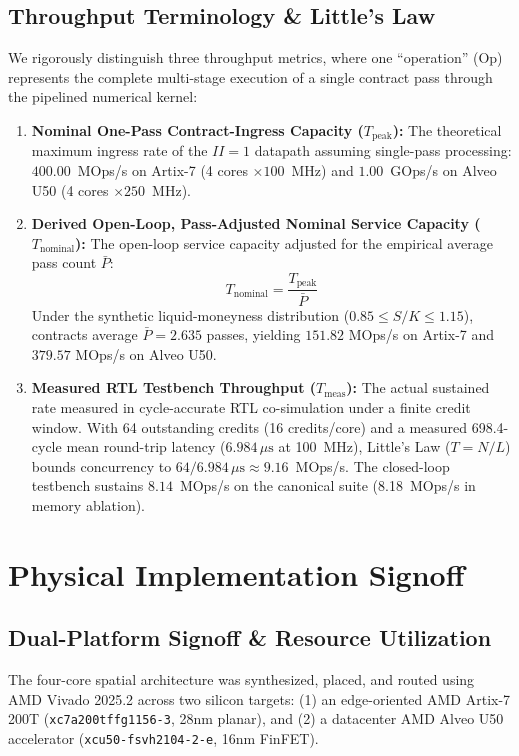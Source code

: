 \documentclass[sigconf,anonymous,review]{acmart}
\begin{document}
\subsection{Throughput Terminology \& Little's Law}
We rigorously distinguish three throughput metrics, where one ``operation'' (Op) represents the complete multi-stage execution of a single contract pass through the pipelined numerical kernel:
\begin{enumerate}
    \item \textbf{Nominal One-Pass Contract-Ingress Capacity ($T_{\text{peak}}$):} The theoretical maximum ingress rate of the $II=1$ datapath assuming single-pass processing: $400.00$~MOps/s on Artix-7 (4 cores $\times 100$~MHz) and $1.00$~GOps/s on Alveo U50 (4 cores $\times 250$~MHz).
    \item \textbf{Derived Open-Loop, Pass-Adjusted Nominal Service Capacity ($T_{\text{nominal}}$):} The open-loop service capacity adjusted for the empirical average pass count $\bar{P}$:
    \begin{equation}
        T_{\text{nominal}} = \frac{T_{\text{peak}}}{\bar{P}}
    \end{equation}
    Under the synthetic liquid-moneyness distribution ($0.85 \le S/K \le 1.15$), contracts average $\bar{P} = 2.635$ passes, yielding $151.82$ MOps/s on Artix-7 and $379.57$ MOps/s on Alveo U50.
    \item \textbf{Measured RTL Testbench Throughput ($T_{\text{meas}}$):} The actual sustained rate measured in cycle-accurate RTL co-simulation under a finite credit window. With 64 outstanding credits (16 credits/core) and a measured 698.4-cycle mean round-trip latency ($6.984\,\mu\text{s}$ at 100~MHz), Little's Law ($T = N / L$) bounds concurrency to $64 / 6.984\,\mu\text{s} \approx 9.16$~MOps/s. The closed-loop testbench sustains $8.14$~MOps/s on the canonical suite (8.18~MOps/s in memory ablation).
\end{enumerate}

\section{Physical Implementation Signoff}
\subsection{Dual-Platform Signoff \& Resource Utilization}
The four-core spatial architecture was synthesized, placed, and routed using AMD Vivado 2025.2 across two silicon targets: (1) an edge-oriented AMD Artix-7 200T (\texttt{xc7a200t}\allowbreak\texttt{ffg1156-3}, 28nm planar), and (2) a datacenter AMD Alveo U50 accelerator (\texttt{xcu50-fsvh2104-2-e}, 16nm FinFET).
\end{document}
